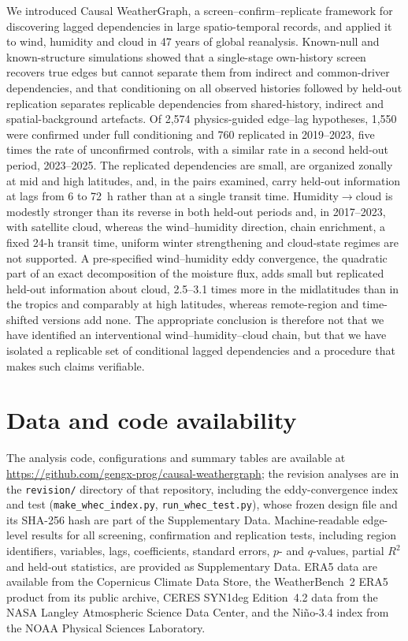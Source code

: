 \documentclass[preprint,12pt]{elsarticle}
\begin{document}
We introduced Causal WeatherGraph, a screen--confirm--replicate framework for discovering lagged dependencies in large spatio-temporal records, and applied it to wind, humidity and cloud in 47 years of global reanalysis. Known-null and known-structure simulations showed that a single-stage own-history screen recovers true edges but cannot separate them from indirect and common-driver dependencies, and that conditioning on all observed histories followed by held-out replication separates replicable dependencies from shared-history, indirect and spatial-background artefacts. Of 2,574 physics-guided edge--lag hypotheses, 1,550 were confirmed under full conditioning and 760 replicated in 2019--2023, five times the rate of unconfirmed controls, with a similar rate in a second held-out period, 2023--2025. The replicated dependencies are small, are organized zonally at mid and high latitudes, and, in the pairs examined, carry held-out information at lags from 6 to 72~h rather than at a single transit time. Humidity$\rightarrow$cloud is modestly stronger than its reverse in both held-out periods and, in 2017--2023, with satellite cloud, whereas the wind--humidity direction, chain enrichment, a fixed 24-h transit time, uniform winter strengthening and cloud-state regimes are not supported. A pre-specified wind--humidity eddy convergence, the quadratic part of an exact decomposition of the moisture flux, adds small but replicated held-out information about cloud, 2.5--3.1 times more in the midlatitudes than in the tropics and comparably at high latitudes, whereas remote-region and time-shifted versions add none. The appropriate conclusion is therefore not that we have identified an interventional wind--humidity--cloud chain, but that we have isolated a replicable set of conditional lagged dependencies and a procedure that makes such claims verifiable.

\section*{Data and code availability}

The analysis code, configurations and summary tables are available at \url{https://github.com/gengx-prog/causal-weathergraph}; the revision analyses are in the \texttt{revision/} directory of that repository, including the eddy-convergence index and test (\texttt{make\_whec\_index.py}, \texttt{run\_whec\_test.py}), whose frozen design file and its SHA-256 hash are part of the Supplementary Data. Machine-readable edge-level results for all screening, confirmation and replication tests, including region identifiers, variables, lags, coefficients, standard errors, $p$- and $q$-values, partial $R^2$ and held-out statistics, are provided as Supplementary Data. ERA5 data are available from the Copernicus Climate Data Store, the WeatherBench~2 ERA5 product from its public archive, CERES SYN1deg Edition~4.2 data from the NASA Langley Atmospheric Science Data Center, and the Ni\~no-3.4 index from the NOAA Physical Sciences Laboratory.
\end{document}
